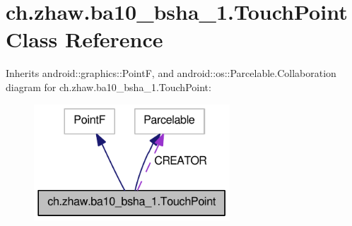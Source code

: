 \hypertarget{classch_1_1zhaw_1_1ba10__bsha__1_1_1TouchPoint}{
\section{ch.zhaw.ba10\_\-bsha\_\-1.TouchPoint Class Reference}
\label{classch_1_1zhaw_1_1ba10__bsha__1_1_1TouchPoint}
}


Inherits android::graphics::PointF, and android::os::Parcelable.Collaboration diagram for ch.zhaw.ba10\_\-bsha\_\-1.TouchPoint:\nopagebreak
\begin{figure}[H]
\begin{center}
\leavevmode
\includegraphics[width=208pt]{classch_1_1zhaw_1_1ba10__bsha__1_1_1TouchPoint__coll__graph}
\end{center}
\end{figure}
